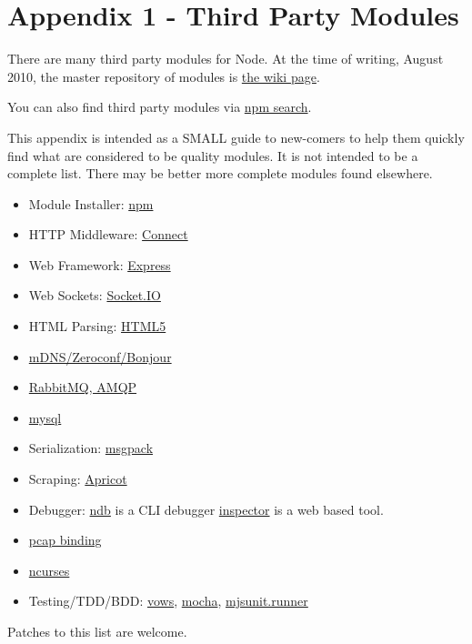\section{Appendix 1 - Third Party Modules}

There are many third party modules for Node. At the time of writing,
August 2010, the master repository of modules is
\href{https://github.com/joyent/node/wiki/modules}{the wiki page}.

You can also find third party modules via
\href{http://search.npmjs.org}{npm search}.

This appendix is intended as a SMALL guide to new-comers to help them
quickly find what are considered to be quality modules. It is not
intended to be a complete list. There may be better more complete
modules found elsewhere.

\begin{itemize}
\item
  Module Installer: \href{https://github.com/isaacs/npm}{npm}
\item
  HTTP Middleware: \href{https://github.com/senchalabs/connect}{Connect}
\item
  Web Framework: \href{https://github.com/visionmedia/express}{Express}
\item
  Web Sockets: \href{https://github.com/learnboost/socket.io}{Socket.IO}
\item
  HTML Parsing: \href{https://github.com/aredridel/html5}{HTML5}
\item
  \href{https://github.com/agnat/node\_mdns}{mDNS/Zeroconf/Bonjour}
\item
  \href{https://github.com/postwait/node-amqp}{RabbitMQ, AMQP}
\item
  \href{https://github.com/felixge/node-mysql}{mysql}
\item
  Serialization: \href{https://github.com/pgriess/node-msgpack}{msgpack}
\item
  Scraping: \href{https://github.com/silentrob/Apricot}{Apricot}
\item
  Debugger: \href{https://github.com/smtlaissezfaire/ndb}{ndb} is a CLI
  debugger
  \href{https://github.com/dannycoates/node-inspector}{inspector} is a
  web based tool.
\item
  \href{https://github.com/mranney/node\_pcap}{pcap binding}
\item
  \href{https://github.com/mscdex/node-ncurses}{ncurses}
\item
  Testing/TDD/BDD: \href{http://vowsjs.org/}{vows},
  \href{https://github.com/visionmedia/mocha}{mocha},
  \href{https://github.com/tmpvar/mjsunit.runner}{mjsunit.runner}
\end{itemize}

Patches to this list are welcome.
